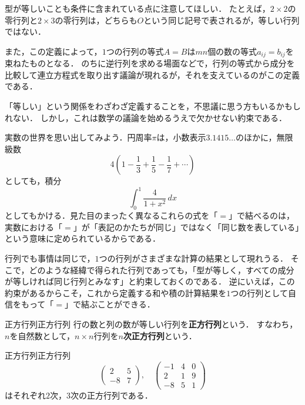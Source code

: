 型が等しいことも条件に含まれている点に注意してほしい．
たとえば，$2 \times 2$の零行列と$2 \times 3$の零行列は，どちらも$O$という同じ記号で表されるが，等しい行列ではない．
 
また，この定義によって，$1$つの行列の等式$A = B$は$mn$個の数の等式$a_{ij} = b_{ij}$を束ねたものとなる．
のちに逆行列を求める場面などで，行列の等式から成分を比較して連立方程式を取り出す議論が現れるが，それを支えているのがこの定義である．
 
\begin{remark}[行列の相等を考える意義]
  「等しい」という関係をわざわざ定義することを，不思議に思う方もいるかもしれない．
  しかし，これは数学の議論を始めるうえで欠かせない約束である．
 
  実数の世界を思い出してみよう．円周率$\pi$は，小数表示$3.1415\ldots$のほかに，無限級数
  \[
    4 \left( 1 - \frac{1}{3} + \frac{1}{5} - \frac{1}{7} + \cdots \right)
  \]
  としても，積分
  \[
    \int_0^1 \frac{4}{1 + x^2} \, dx
  \]
  としてもかける．見た目のまったく異なるこれらの式を「$=$」で結べるのは，実数における「$=$」が「表記のかたちが同じ」ではなく「同じ数を表している」という意味に定められているからである．
 
  行列でも事情は同じで，$1$つの行列がさまざまな計算の結果として現れうる．
  そこで，どのような経緯で得られた行列であっても，「型が等しく，すべての成分が等しければ同じ行列とみなす」と約束しておくのである．
  逆にいえば，この約束があるからこそ，これから定義する和や積の計算結果を$1$つの行列として自信をもって「$=$」で結ぶことができる．
\end{remark}

\begin{definition}{正方行列}{正方行列}
  行の数と列の数が等しい行列を\textbf{正方行列}という．
  すなわち，$n$を自然数として，$n \times n$行列を\textbf{$n$次正方行列}という．
\end{definition}

\begin{example}{正方行列}{正方行列}
  \[
    \begin{pmatrix} 2 & 5 \\ -8 & 7 \end{pmatrix}, \quad
    \begin{pmatrix} -1 & 4 & 0 \\ 2 & 1 & 9 \\ -8 & 5 & 1 \end{pmatrix}
  \]
  はそれぞれ$2$次，$3$次の正方行列である．
\end{example}

